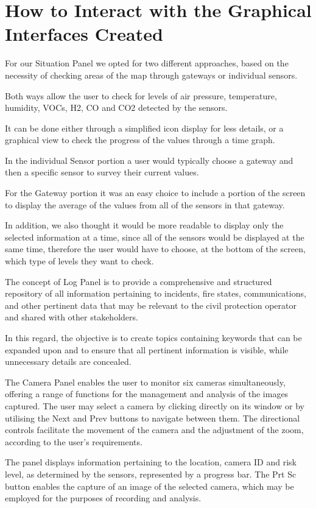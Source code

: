 \section{How to Interact with the Graphical Interfaces Created}
For our Situation Panel we opted for two different approaches, based on the necessity of checking areas of the map through gateways or individual sensors. \par
Both ways allow the user to check for levels of air pressure, temperature, humidity, VOCs, H2, CO and CO2 detected by the sensors. \par
It can be done either through a simplified icon display for less details, or a graphical view to check the progress of the values through a time graph. \par
In the individual Sensor portion a user would typically choose a gateway and then a specific sensor to survey their current values. \par
For the Gateway portion it was an easy choice to include a portion of the screen to display the average of the values from all of the sensors in that gateway. \par
In addition, we also thought it would be more readable to display only the selected information at a time, since all of the sensors would be displayed at the same time, therefore the user would have to choose, at the bottom of the screen, which type of levels they want to check. \par
The concept of Log Panel is to provide a comprehensive and structured repository of all information pertaining to incidents, fire states, communications, and other pertinent data that may be relevant to the civil protection operator and shared with other stakeholders. \par
In this regard, the objective is to create topics containing keywords that can be expanded upon and to ensure that all pertinent information is visible, while unnecessary details are concealed. \par
The Camera Panel enables the user to monitor six cameras simultaneously, offering a range of functions for the management and analysis of the images captured. The user may select a camera by clicking directly on its window or by utilising the Next and Prev buttons to navigate between them. The directional controls facilitate the movement of the camera and the adjustment of the zoom, according to the user's requirements. \par
The panel displays information pertaining to the location, camera ID and risk level, as determined by the sensors, represented by a progress bar. The Prt Sc button enables the capture of an image of the selected camera, which may be employed for the purposes of recording and analysis. \par
